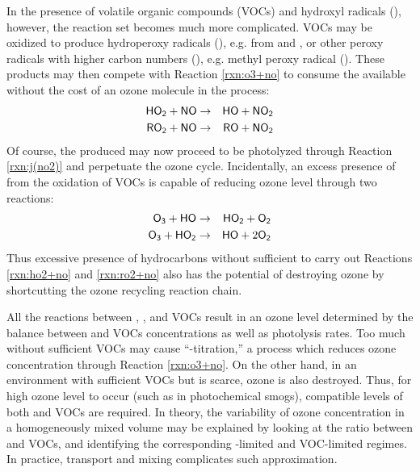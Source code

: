 In the presence of volatile organic compounds (VOCs) and hydroxyl radicals (), however, the reaction set becomes much more complicated. VOCs may be oxidized to produce hydroperoxy radicals (), e.g. from  and , or other peroxy radicals with higher carbon numbers (), e.g. methyl peroxy radical (). These products may then compete with Reaction \ref{rxn:o3+no} to consume the available  without the cost of an ozone molecule in the process:
\begin{eqnarray}
	\chem{HO_2} + \chem{NO} &\rightarrow& \chem{HO} + \chem{NO_2} \label{rxn:ho2+no} \\
	\chem{RO_2} + \chem{NO} &\rightarrow& \chem{RO} + \chem{NO_2} \label{rxn:ro2+no}
\end{eqnarray}
Of course, the produced  may now proceed to be photolyzed through Reaction \ref{rxn:j(no2)} and perpetuate the ozone cycle. Incidentally, an excess presence of  from the oxidation of VOCs is capable of reducing ozone level through two reactions:
\begin{eqnarray}
	\chem{O_3} + \chem{HO} &\rightarrow& \chem{HO_2} + \chem{O_2} \label{rxn:o3+ho} \\
	\chem{O_3} + \chem{HO_2} &\rightarrow& \chem{HO} + 2\chem{O_2} \label{rxn:o3+ho2}
\end{eqnarray}
Thus excessive presence of hydrocarbons without sufficient  to carry out Reactions \ref{rxn:ho2+no} and \ref{rxn:ro2+no} also has the potential of destroying ozone by shortcutting the ozone recycling reaction chain.

All the reactions between , ,  and VOCs result in an ozone level determined by the balance between  and VOCs concentrations as well as photolysis rates. Too much  without sufficient VOCs may cause ``-titration,'' a process which reduces ozone concentration through Reaction \ref{rxn:o3+no}. On the other hand, in an environment with sufficient VOCs but  is scarce, ozone is also destroyed. Thus, for high ozone level to occur (such as in photochemical smogs), compatible levels of both  and VOCs are required. In theory, the variability of ozone concentration in a homogeneously mixed volume may be explained by looking at the ratio between  and VOCs, and identifying the corresponding -limited and VOC-limited regimes. In practice, transport and mixing complicates such approximation.


